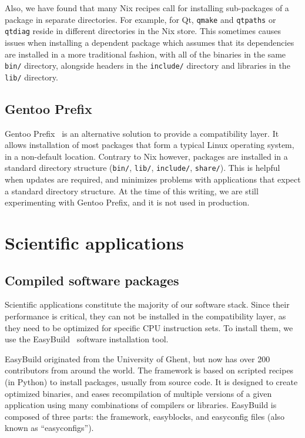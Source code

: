 \documentclass[sigconf]{acmart}
\begin{document}
Also, we have found that many Nix recipes call for installing sub-packages of a package in separate directories. For example, for Qt, \texttt{qmake} and \texttt{qtpaths} or \texttt{qtdiag} reside in different directories in the Nix store. This sometimes causes issues when installing a dependent package which assumes that its dependencies are installed in a more traditional fashion, with all of the binaries in the same \texttt{bin/} directory, alongside headers in the \texttt{include/} directory and libraries in the \texttt{lib/} directory.  

\subsection{Gentoo Prefix}
\label{sub:Gentoo_Prefix}
Gentoo Prefix~\cite{Gentoo} is an alternative solution to provide a compatibility layer. It allows installation of most packages that form a typical Linux operating system, in a non-default location. Contrary to Nix however, packages are installed in a standard directory structure (\texttt{bin/}, \texttt{lib/}, \texttt{include/}, \texttt{share/}). This is helpful when updates are required, and minimizes problems with applications that expect a standard directory structure. At the time of this writing, we are still experimenting with Gentoo Prefix, and it is not used in production. 

\section{Scientific applications}
\label{sec:Scientific_applications}

\subsection{Compiled software packages}
\label{sub:Compiled_software_packages}
Scientific applications constitute the majority of our software stack. Since their performance is critical, they can not be installed in the compatibility layer, as they need to be optimized for specific CPU instruction sets. To install them, we use the EasyBuild~\cite{EasyBuild2012,EasyBuild2014,EasyBuild2016} software installation tool.

EasyBuild originated from the University of Ghent, but now has over 200 contributors from around the world. The framework is based on scripted recipes (in Python) to install packages, usually from source code. It is designed to create optimized binaries, and eases recompilation of multiple versions of a given application using many combinations of compilers or libraries. EasyBuild is composed of three parts: the framework, easyblocks, and easyconfig files (also known as ``easyconfigs''). 
\end{document}

